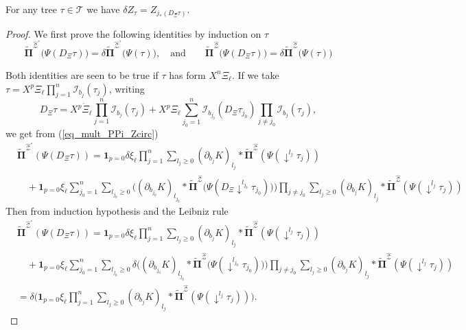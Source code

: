 \documentclass[11pt]{preprint}
\newcommand{\mcI}{\mathcal{I}}
\newcommand{\mcZ}{\mathcal{Z}}
\newcommand{\mcT}{\mathcal{T}}
\def\PPi{\boldsymbol{\Pi}}
\def\eqref#1{(\ref{#1})}
\begin{document}
\begin{proposition} \label{lem_deltaZ_Zj*}
	For any tree $\tau\in\mcT$ we have
	$
	\delta Z_\tau = Z_{j_*(D_\Xi\tau)}.
	$
\end{proposition}
\begin{proof}
We first prove the following identities by induction on $\tau$
\begin{equation}\label{eq_commut_Pi_delta}
\widetilde{\PPi}^{\widehat{\mcZ}^\circ}\big(\Psi(D_\Xi\tau)\big) =\delta \widetilde{\PPi}^{\widehat{\mcZ}^\circ}\big( \Psi(\tau)  \big), \quad\text{and}\qquad \widetilde{\PPi}^{\widehat{\mcZ}}\big(\Psi(D_\Xi\tau)\big) =\delta \widetilde{\PPi}^{\widehat{\mcZ}}\big( \Psi(\tau)  \big) 
\end{equation}

Both identities are seen to be true if $\tau$ has form $X^n\Xi_\ell$. If we take $\tau=X^p\Xi_\ell\prod_{j=1}^n\mcI_{b_j}(\tau_j)$, writing 
$$
D_\Xi\tau = X^p \dot{\Xi}_\ell\prod_{j=1}^n\mcI_{b_j}(\tau_j) + X^p\Xi_\ell \sum_{j_0=1}^n  \mcI_{b_{j_0}}(D_\Xi\tau_{j_0}) \prod_{j\ne j_0}\mcI_{b_j}(\tau_j),
$$
we get from \eqref{eq_mult_PPi_Zcirc}
\begin{align*}
&	\widetilde{\PPi}^{\widehat{\mcZ}^\circ}(\Psi(D_\Xi\tau)) =
	 \mathbf{1}_{p=0} \delta\xi_\ell\prod_{j=1}^n\sum_{l_j\geq0} (\partial_{b_j}K)_{l_j}*\widetilde{\PPi}^{\widehat{\mcZ}}(\Psi(\downarrow^{l_j}\tau_j)) 
	\\
	&\quad+ \mathbf{1}_{p=0}\xi_\ell \sum_{j_0=1}^n \sum_{l_{j_0}\geq 0}   \Big((\partial_{b_{j_0}}K)_{l_{j_0}}* \widetilde{\PPi}^{\widehat{\mcZ}}\big(\Psi(D_\Xi\downarrow^{l_{j_0}}\tau_{j_0})\big)\Big) \prod_{j\ne j_0}\sum_{l_j\geq0} (\partial_{b_j}K)_{l_j}* \widetilde{\PPi}^{\widehat{\mcZ}}(\Psi(\downarrow^{l_j}\tau_j))
\end{align*}
Then from induction hypothesis and the Leibniz rule
\begin{align*}
	& \widetilde{\PPi}^{\widehat{\mcZ}^\circ}(\Psi(D_\Xi\tau)) =
	 \mathbf{1}_{p=0} \delta\xi_\ell\prod_{j=1}^n\sum_{l_j\geq0}(\partial_{b_j}K)_{l_j}*\widetilde{\PPi}^{\widehat{\mcZ}}(\Psi(\downarrow^{l_j}\tau_j)) 
	\\
	&\quad+  \mathbf{1}_{p=0}\xi_\ell \sum_{j_0=1}^n\sum_{l_{j_0}\geq 0 }  \delta\Big((\partial_{b_{j_0}}K)_{l_{j_0}}* \widetilde{\PPi}^{\widehat{\mcZ}}\big(\Psi({\downarrow^{l_{j_0}}}\tau_{j_0})\big)\Big) \prod_{j\ne j_0}\sum_{l_j\geq0}(\partial_{b_j}K)_{l_j}* \widetilde{\PPi}^{\widehat{\mcZ}}(\Psi(\downarrow^{l_j}\tau_j))
	\\
	&= 	\delta \Big( \mathbf{1}_{p=0} \xi_\ell\prod_{j=1}^n\sum_{l_j\geq0}(\partial_{b_j}K)_{l_j}*\widetilde{\PPi}^{\widehat{\mcZ}}(\Psi(\downarrow^{l_j}\tau_j))\Big).

\end{align*}
\end{proof}
\end{document}
